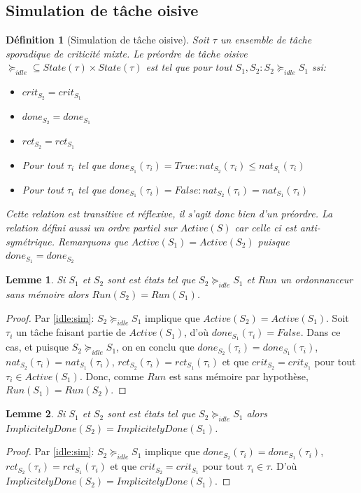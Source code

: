 \documentclass[11pt,a4paper,oneside]{book}
\theoremstyle{break}
\newtheorem{defin}{Définition}
\theoremstyle{breakplain}
\newtheorem{lem}{Lemme}
\begin{document}
\subsection{Simulation de tâche oisive}

\begin{defin}[Simulation de tâche oisive]
\label{idle:sim}
Soit $\tau$ un ensemble de tâche sporadique de criticité mixte. Le préordre de tâche oisive $\succeq_{idle} \subseteq State(\tau)\times State(\tau)$ est tel que pour tout $S_1, S_2 : S_2 \succeq_{idle}S_1$ ssi:
\begin{itemize}
\item $crit_{S_2} = crit_{S_1}$
\item $done_{S_2} = done_{S_1}$
\item $rct_{S_2} = rct_{S_1}$
\item Pour tout $\tau_i$ tel que $done_{S_1}(\tau_i) = True : nat_{S_2}(\tau_i) \leq nat_{S_1}(\tau_i)$
\item Pour tout $\tau_i$ tel que $done_{S_1}(\tau_i) = False : nat_{S_2}(\tau_i) = nat_{S_1}(\tau_i)$
\end{itemize}
Cette relation est transitive et réflexive, il s'agit donc bien d'un préordre. La relation défini aussi un ordre partiel sur $Active(S)$ car celle ci est anti-symétrique.
Remarquons que $Active(S_1) = Active (S_2)$ puisque $done_{S_1} = done_{S_2}$
\end{defin}

\begin{lem}
\label{idle:runeq}
Si $S_1$ et $S_2$ sont est états tel que $S_2 \succeq_{idle}S_1$ et $Run$ un ordonnanceur sans mémoire alors $Run (S_2) = Run(S_1)$.
\end{lem}
\begin{proof} Par \autoref{idle:sim}: $S_2 \succeq_{idle} S_1$ implique que $Active(S_2) = Active(S_1)$. Soit $\tau_i$ un tâche faisant partie de $Active(S_1)$, d'où $done_{S_1}(\tau_i) = False$. Dans ce cas, et puisque $S_2 \succeq_{idle} S_1$, on en conclu que $done_{S_2}(\tau_i) = done_{S_1}(\tau_i)$, $nat_{S_2}(\tau_i) = nat_{S_1}(\tau_i)$, $rct_{S_2}(\tau_i) = rct_{S_1}(\tau_i)$ et que $crit_{S_2} = crit_{S_1}$ pour tout $\tau_i \in Active(S_1)$. Donc, comme $Run$ est sans mémoire par hypothèse, $Run(S_1) = Run(S_2)$.
\end{proof}

\begin{lem}
\label{idle:impdoneeq}
Si $S_1$ et $S_2$ sont est états tel que $S_2 \succeq_{idle} S_1$ alors $ImplicitelyDone(S_2) = ImplicitelyDone(S_1)$.
\end{lem}
\begin{proof} Par \autoref{idle:sim}: $S_2 \succeq_{idle} S_1$ implique que $done_{S_2}(\tau_i) = done_{S_1}(\tau_i)$, $rct_{S_2}(\tau_i) = rct_{S_1}(\tau_i)$ et que $crit_{S_2} = crit_{S_1}$ pour tout $\tau_i \in \tau$. D'où $ImplicitelyDone(S_2) = ImplicitelyDone(S_1)$.
\end{proof}
\end{document}
